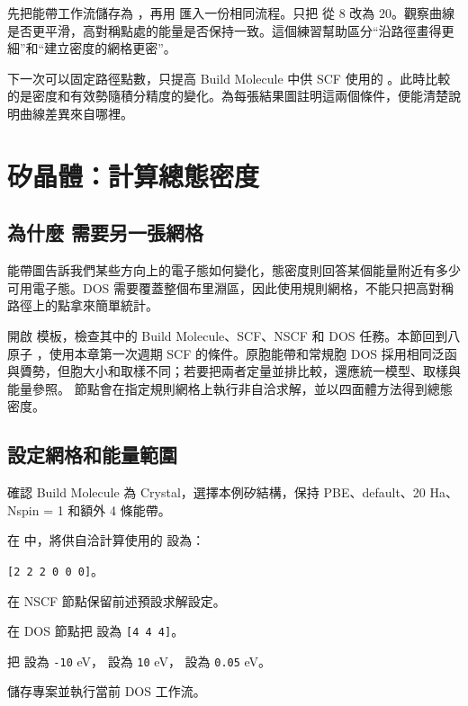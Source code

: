 先把能帶工作流儲存為 ，再用  匯入一份相同流程。只把 \mbox{} 從 $8$ 改為 $20$。觀察曲線是否更平滑，高對稱點處的能量是否保持一致。這個練習幫助區分“沿路徑畫得更細”和“建立密度的網格更密”。

下一次可以固定路徑點數，只提高 Build Molecule 中供 SCF 使用的 \mbox{}。此時比較的是密度和有效勢隨積分精度的變化。為每張結果圖註明這兩個條件，便能清楚說明曲線差異來自哪裡。

\section{矽晶體：計算總態密度}

\subsection{為什麼  需要另一張網格}

能帶圖告訴我們某些方向上的電子態如何變化，態密度則回答某個能量附近有多少可用電子態。DOS 需要覆蓋整個布里淵區，因此使用規則網格，不能只把高對稱路徑上的點拿來簡單統計。

開啟  模板，檢查其中的 Build Molecule、SCF、NSCF 和 DOS 任務。本節回到八原子 ，使用本章第一次週期 SCF 的條件。原胞能帶和常規胞 DOS 採用相同泛函與贗勢，但胞大小和取樣不同；若要把兩者定量並排比較，還應統一模型、取樣與能量參照。 節點會在指定規則網格上執行非自洽求解，並以四面體方法得到總態密度。

\subsection{設定網格和能量範圍}

\begin{steps}
\item 確認 Build Molecule 為 Crystal，選擇本例矽結構，保持 PBE、default、20 Ha、Nspin = 1 和額外 4 條能帶。
\item 在  中，將供自洽計算使用的 \mbox{} 設為：
\par\nobreak\noindent\mbox{\texttt{[2 2 2 0 0 0]}}。
\item 在 NSCF 節點保留前述預設求解設定。
\item 在 DOS 節點把  設為 \texttt{[4 4 4]}。
\item 把  設為 \texttt{-10} eV， 設為 \texttt{10} eV， 設為 \texttt{0.05} eV。
\item 儲存專案並執行當前 DOS 工作流。
\end{steps}

